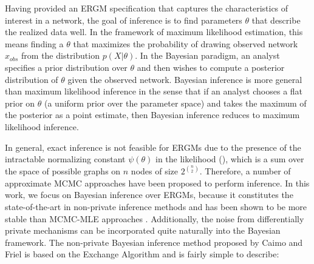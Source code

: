 Having provided an ERGM specification that captures the characteristics of interest in a network, the goal of inference is to find parameters $\theta$ that describe the realized data well. In the framework of maximum likelihood estimation, this means finding a $\theta$ that maximizes the probability of drawing observed network $x_{obs}$ from the distribution $p(X|\theta)$. In the Bayesian paradigm, an analyst specifies a prior distribution over $\theta$ and then wishes to compute a posterior distribution of $\theta$ given the observed network. Bayesian inference is more general than maximum likelihood inference in the sense that if an analyst chooses a flat prior on $\theta$ (a uniform prior over the parameter space) and takes the maximum of the posterior as a point estimate, then Bayesian inference reduces to maximum likelihood inference.

In general, exact inference is not feasible for ERGMs due to the presence of the intractable normalizing constant $\psi(\theta)$ in the likelihood (), which is a sum over the space of possible graphs on $n$ nodes of size $2^{\binom{n}{2}}$. Therefore, a number of approximate MCMC approaches have been proposed to perform inference. In this work, we focus on Bayesian inference over ERGMs, because it constitutes the state-of-the-art in non-private inference methods and has been shown to be more stable than MCMC-MLE approaches \cite{CF11}. Additionally,  the noise from differentially private mechanisms can be incorporated quite naturally into the Bayesian framework.  The non-private Bayesian inference method proposed by Caimo and Friel is based on the Exchange Algorithm\cite{MGM12} and is fairly simple to describe: 

